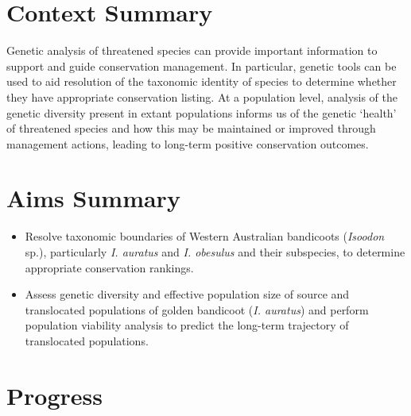\documentclass[version=last, paper=a4, DIV=18, usenames, dvipsnames]{scrartcl}
\begin{document}
\section{Context Summary}



Genetic analysis of threatened species can provide important information to support and guide conservation management. In particular, genetic tools can be used to aid resolution of the taxonomic identity of species to determine whether they have appropriate conservation listing. At a population level, analysis of the genetic diversity present in extant populations informs us of the genetic `health' of threatened species and how this may be maintained or improved through management actions, leading to long-term positive conservation outcomes.






\section{Aims Summary}



\begin{itemize}

  \item Resolve taxonomic boundaries of Western Australian bandicoots (\emph{Isoodon} sp.), particularly \emph{I. auratus} and \emph{I. obesulus} and their subspecies, to determine appropriate conservation rankings.

  \item Assess genetic diversity and effective population size of source and translocated populations of golden bandicoot (\emph{I. auratus}) and perform population viability analysis to predict the long-term trajectory of translocated populations.

\end{itemize}






\section{Progress}
\end{document}
